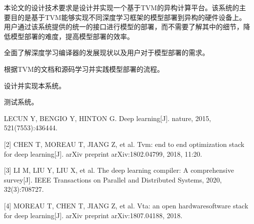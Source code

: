 \assignReq
本论文的设计技术要求是设计并实现一个基于TVM的异构计算平台。该系统的主要目的是基于TVM能够实现不同深度学习框架的模型部署到异构的硬件设备上。用户通过该系统提供的统一的接口进行模型的部署，而不需要了解其中的细节，降低模型部署的难度，提高模型部署的效率。

\assignWork
全面了解深度学习编译器的发展现状以及用户对于模型部署的需求。

根据TVM的文档和源码学习并实践模型部署的流程。

设计并实现本系统。

测试系统。

\assignRef
[1] LECUN Y, BENGIO Y, HINTON G. Deep learning[J]. nature, 2015, 521(7553):436­444.

[2] CHEN T, MOREAU T, JIANG Z, et al. Tvm: end­ to ­end optimization stack for deep learning[J]. arXiv preprint arXiv:1802.04799, 2018, 11:20.

[3] LI M, LIU Y, LIU X, et al. The deep learning compiler: A comprehensive survey[J]. IEEE Transactions on Parallel and Distributed Systems, 2020, 32(3):708­727.

[4] MOREAU T, CHEN T, JIANG Z, et al. Vta: an open hardware­software stack for deep learning[J]. arXiv preprint arXiv:1807.04188, 2018.